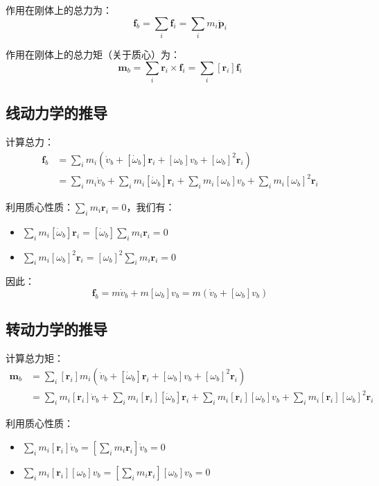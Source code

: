 \documentclass[12pt,a4paper]{article}
\begin{document}
作用在刚体上的总力为：
\begin{equation}
\bm{f}_b = \sum_i \bm{f}_i = \sum_i m_i \ddot{\bm{p}}_i
\end{equation}

作用在刚体上的总力矩（关于质心）为：
\begin{equation}
\bm{m}_b = \sum_i \bm{r}_i \times \bm{f}_i = \sum_i [\bm{r}_i] \bm{f}_i
\end{equation}

\subsection{线动力学的推导}

计算总力：
\begin{align}
\bm{f}_b &= \sum_i m_i(\dot{v}_b + [\dot{\omega}_b]\bm{r}_i + [\omega_b]v_b + [\omega_b]^2 \bm{r}_i) \\
&= \sum_i m_i \dot{v}_b + \sum_i m_i [\dot{\omega}_b]\bm{r}_i + \sum_i m_i [\omega_b]v_b + \sum_i m_i [\omega_b]^2 \bm{r}_i
\end{align}

利用质心性质：$\sum_i m_i \bm{r}_i = 0$，我们有：
\begin{itemize}
\item $\sum_i m_i [\dot{\omega}_b]\bm{r}_i = [\dot{\omega}_b] \sum_i m_i \bm{r}_i = 0$
\item $\sum_i m_i [\omega_b]^2 \bm{r}_i = [\omega_b]^2 \sum_i m_i \bm{r}_i = 0$
\end{itemize}

因此：
\begin{equation}
\bm{f}_b = m \dot{v}_b + m [\omega_b] v_b = m(\dot{v}_b + [\omega_b] v_b)
\label{eq:linear_dynamics}
\end{equation}

\subsection{转动力学的推导}

计算总力矩：
\begin{align}
\bm{m}_b &= \sum_i [\bm{r}_i] m_i(\dot{v}_b + [\dot{\omega}_b]\bm{r}_i + [\omega_b]v_b + [\omega_b]^2 \bm{r}_i) \\
&= \sum_i m_i [\bm{r}_i]\dot{v}_b + \sum_i m_i [\bm{r}_i][\dot{\omega}_b]\bm{r}_i + \sum_i m_i [\bm{r}_i][\omega_b]v_b + \sum_i m_i [\bm{r}_i][\omega_b]^2 \bm{r}_i
\end{align}

利用质心性质：
\begin{itemize}
\item $\sum_i m_i [\bm{r}_i]\dot{v}_b = [\sum_i m_i \bm{r}_i]\dot{v}_b = 0$
\item $\sum_i m_i [\bm{r}_i][\omega_b]v_b = [\sum_i m_i \bm{r}_i][\omega_b]v_b = 0$
\end{itemize}
\end{document}
